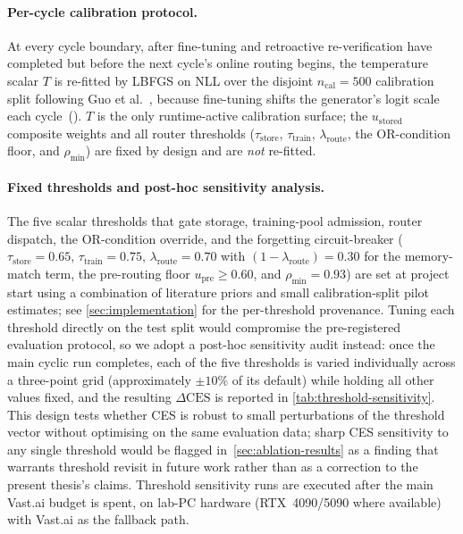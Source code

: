 \paragraph{Per-cycle calibration protocol.}
At every cycle boundary, after fine-tuning and retroactive
re-verification have completed but before the next cycle's online
routing begins, the temperature scalar $T$ is re-fitted by LBFGS on
NLL over the disjoint $n_{\text{cal}} = 500$ calibration split
following Guo et al.~\cite{pmlr-v70-guo17a}, because fine-tuning
shifts the generator's logit scale each
cycle~(\cite{ovadia2019trust,thulasidasan2019mixup}). $T$ is the
only runtime-active calibration surface; the $u_{\text{stored}}$
composite weights and all router thresholds
($\tau_{\text{store}}$, $\tau_{\text{train}}$,
$\lambda_{\text{route}}$, the OR-condition floor, and $\rho_{\min}$)
are fixed by design and are \emph{not} re-fitted.

\paragraph{Fixed thresholds and post-hoc sensitivity analysis.}
The five scalar thresholds that gate storage, training-pool admission,
router dispatch, the OR-condition override, and the forgetting
circuit-breaker ($\tau_{\text{store}} = 0.65$,
$\tau_{\text{train}} = 0.75$, $\lambda_{\text{route}} = 0.70$ with
$(1-\lambda_{\text{route}}) = 0.30$ for the memory-match term,
the pre-routing floor $u_{\text{pre}} \geq 0.60$, and
$\rho_{\min} = 0.93$) are set at project start using a combination of
literature priors and small calibration-split pilot estimates; see
\cref{sec:implementation} for the per-threshold provenance. Tuning
each threshold directly on the test split would compromise the
pre-registered evaluation protocol, so we adopt a post-hoc sensitivity
audit instead: once the main cyclic run completes, each of the five
thresholds is varied individually across a three-point grid
(approximately $\pm 10\%$ of its default) while holding all other
values fixed, and the resulting $\Delta\text{CES}$ is reported in
\cref{tab:threshold-sensitivity}. This design tests whether CES is
robust to small perturbations of the threshold vector without
optimising on the same evaluation data; sharp CES sensitivity to any
single threshold would be flagged in~\cref{sec:ablation-results} as a
finding that warrants threshold revisit in future work rather than as
a correction to the present thesis's claims. Threshold sensitivity
runs are executed after the main Vast.ai budget is spent, on lab-PC
hardware (RTX~4090/5090 where available) with Vast.ai as the
fallback path.

